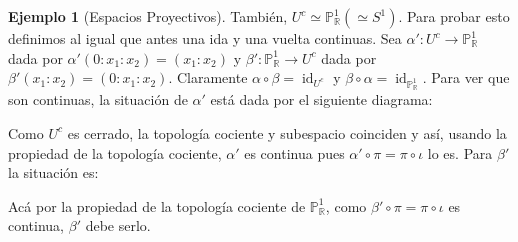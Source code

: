 \documentclass[12pt]{book}
\theoremstyle{definition}
\newtheorem{ex}[teo]{Ejemplo}
\newcommand{\RR}{\mathbb{R}}      %
\DeclareMathOperator{\id}{id}
\begin{document}
\begin{ex}[Espacios Proyectivos]
También, $U^c\simeq \mathbb{P}^1_\RR (\simeq S^1)$. Para probar esto definimos al igual que antes una ida y una vuelta continuas. Sea $\alpha':U^c\to \mathbb{P}_\RR^1$ dada por $\alpha'(0:x_1:x_2)=(x_1:x_2)$ y $\beta':\mathbb{P}_\RR^1\to U^c$ dada por $\beta'(x_1:x_2) = (0:x_1:x_2)$. Claramente $\alpha\circ\beta = \id_{U^c}$ y $\beta\circ\alpha = \id_{\mathbb{P}_\RR^1}$. Para ver que son continuas, la situación de $\alpha'$ está dada por el siguiente diagrama:
\begin{center}
\end{center}
Como $U^c$ es cerrado, la topología cociente y subespacio coinciden y así, usando la propiedad de la topología cociente, $\alpha'$ es continua pues $\alpha'\circ \pi = \pi \circ\iota$ lo es. Para $\beta'$ la situación es:
\begin{center}
\end{center}
Acá por la propiedad de la topología cociente de $\mathbb{P}_\RR^1$, como $\beta'\circ \pi = \pi\circ \iota$ es continua, $\beta'$ debe serlo.


\end{ex}
\end{document}
